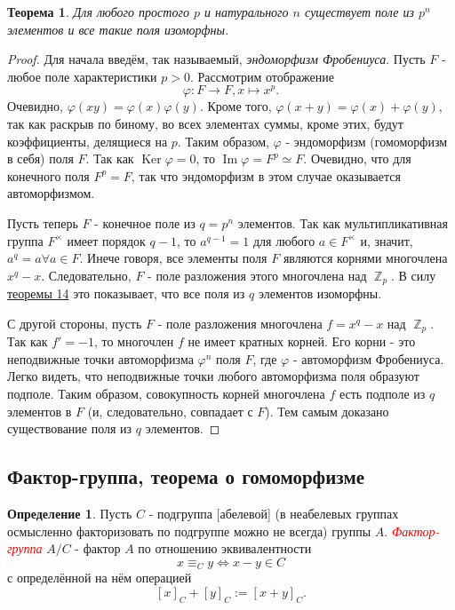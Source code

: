 \documentclass[a4paper,100pt]{article}
\theoremstyle{indented}
\newtheorem{theorem}{Теорема}
\theoremstyle{definition}
\newtheorem{defn}{Определение}
\theoremstyle{remark}
\DeclareMathOperator{\Ker}{Ker}
\DeclareMathOperator{\Imf}{Im}
\DeclareMathOperator{\ZZ}{\mathbb{Z}}
\begin{document}
\begin{theorem}
    Для любого простого $p$ и натурального $n$ существует поле из $p^n$ элементов и все такие поля изоморфны.
\end{theorem}

\begin{proof}
    Для начала введём, так называемый, \textit{эндоморфизм Фробениуса}. Пусть $F$ - любое поле характеристики $p>0$. Рассмотрим отображение
    \[
        \varphi:F\rightarrow F, x\mapsto x^p.
    \]
    Очевидно, $\varphi(xy)=\varphi(x)\varphi(y)$. Кроме того, $\varphi(x+y)=\varphi(x)+\varphi(y)$, так как раскрыв по биному, во всех элементах суммы, кроме этих, будут коэффициенты, делящиеся на $p$. Таким образом, $\varphi$ - эндоморфизм (гомоморфизм в себя) поля $F$.  Так как $\Ker\varphi=0$, то $\Imf \varphi=F^p\simeq F$. Очевидно, что для конечного поля $F^p=F$, так что эндоморфизм в этом случае оказывается автоморфизмом.\ 
    
    Пусть теперь $F$ - конечное поле из $q=p^n$ элементов. Так как мультипликативная группа $F^\times$ имеет порядок $q-1$, то $a^{q-1}=1$ для любого $a\in F^\times$ и, значит, $a^q=a \forall a\in F$. Инече говоря, все элементы поля $F$ являются корнями многочлена $x^q-x$. Следовательно, $F$ - поле разложения этого многочлена над $\ZZ_p$. В силу \hyperlink{t6}{теоремы 14} это показывает, что все поля из $q$ элементов изоморфны.\ 

    С другой стороны, пусть $F$ - поле разложения многочлена $f=x^q-x$ над $\ZZ_p$. Так как $f'=-1$, то многочлен $f$ не имеет кратных корней. Его корни - это неподвижные точки автоморфизма $\varphi^n$ поля $F$, где $\varphi$ - автоморфизм Фробениуса. Легко видеть, что неподвижные точки любого автоморфизма поля образуют подполе. Таким образом, совокупность корней многочлена $f$ есть подполе из $q$ элементов в $F$ (и, следовательно, совпадает с $F$). Тем самым доказано существование поля из $q$ элементов.
\end{proof}

\resetall

\subsection{Фактор-группа, теорема о гомоморфизме}

\begin{defn}
    Пусть $C$ - подгруппа [абелевой] (в неабелевых группах осмысленно факторизовать по подгруппе можно не всегда) группы $A$. \hypertarget{n94}{\textcolor{red}{\textit{Фактор-группа}}} $A/C$ - фактор $A$ по отношению эквивалентности
    \[
        x\equiv_C y \Leftrightarrow x-y\in C
    \] 
    с определённой на нём операцией
    \[
        [x]_C+[y]_C:=[x+y]_C.
    \]
\end{defn}
\end{document}
